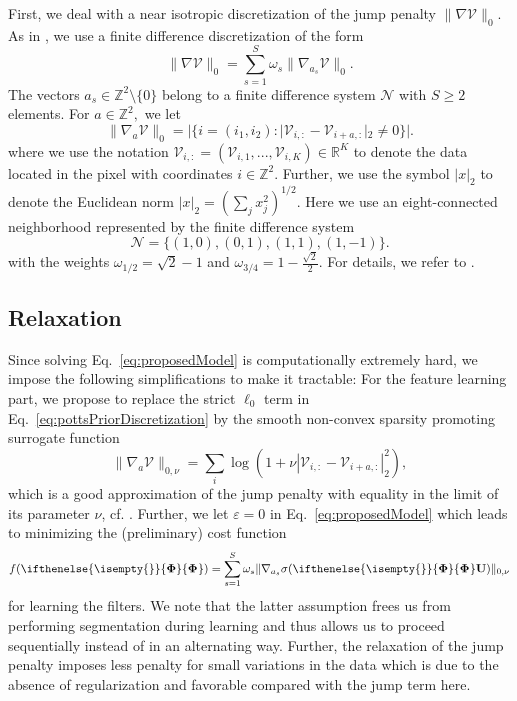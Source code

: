 \documentclass[journal]{IEEEtran}
\newcommand{\Matrix}[1]{\mathbf{#1}}
\newcommand{\Tensor}[1]{\mathcal{#1}}
\newcommand{\AOF}[1]{\ifthenelse{\isempty{#1}}{\boldsymbol{\Phi}}{\boldsymbol{\Phi}_{#1}}}
\newcommand{\SCI}{\Matrix{U}}
\newcommand{\caFRT}{\Tensor{V}}
\begin{document}
First, we deal with a near isotropic discretization of 
the jump penalty $\|\nabla \caFRT  \|_0.$
As in \cite{storath2014fast}, we use 
a finite difference discretization of the form 
\begin{equation}\label{eq:pottsDisc}
	\| \nabla \caFRT \|_0 = \sum_{ s=1}^S  \omega_s \| \nabla_{a_s} \caFRT \|_0.
\end{equation}
The vectors $a_s \in \mathbb{Z}^2 \setminus \{0\}$
 belong to a finite difference system 
$\mathscr{N}$ with $S \geq 2$ elements. 
For $a \in \mathbb{Z}^2,$ we let
\begin{equation}\label{eq:pottsPriorDiscretization}
\| \nabla_{a} \caFRT \|_0 = | \{ i = (i_1, i_2) : |\caFRT_{i, :} - \caFRT_{i + a, :}|_2 \neq 0 \}|.
\end{equation}
where we use the notation $\caFRT_{i, :} = (\caFRT_{i,1}, ..., \caFRT_{i,K}) \in \mathbb{R}^K$
to denote the data located in the pixel with coordinates $i \in \mathbb{Z}^2.$
Further, we use the symbol $|x|_2$ to denote the Euclidean norm $|x|_2 = (\sum_j x_j^2)^{1/2}.$
Here we use an eight-connected neighborhood 
represented by the finite difference system
\begin{equation}\label{eq:N1}
	 \mathscr{N} = \{ (1,0), (0,1), (1,1), (1,-1)\}.
\end{equation}
with the weights 
$
	\omega_{1/2} = \sqrt{2} - 1$ and $\omega_{3/4} =  1 - \frac{\sqrt{2}}{2}.
$
For details, we refer to \cite{chambolle1999finite, storath2014fast}.



\subsection{Relaxation}
\label{subsec:relaxLearning}

Since solving Eq.~\eqref{eq:proposedModel} is computationally extremely hard, 
we impose the following simplifications to make it tractable:
For the feature learning part, 
we propose to replace the strict $\ell_0$ term in Eq.~\eqref{eq:pottsPriorDiscretization} by the smooth non-convex sparsity promoting surrogate function
\begin{equation}\label{eq:l0_log_approx}
    \| \nabla_{a} \Tensor{V} \|_{0,\nu} = \sum_{i} \log (1 + \nu |\caFRT_{i, :} - \caFRT_{i + a, :}|_2^2),
\end{equation}
which is a good approximation of the jump penalty with equality in the limit of its parameter $\nu$, cf.  \cite{kiechle2015}. Further, we let $\varepsilon = 0$ in Eq.~\eqref{eq:proposedModel}
which leads to minimizing the (preliminary) cost function
\begin{equation} \label{eq:sparsity_objective}
f(\AOF{}) = \sum_{ s=1}^S  \omega_s \| \nabla_{a_s} \sigma(\AOF{} \SCI) \|_{0, \nu}
\end{equation}
for learning the filters.
We note that the latter assumption frees us from performing segmentation during learning and thus allows us to proceed sequentially instead of in an alternating way. Further, the relaxation of the jump penalty imposes less penalty for small variations in the data which is due to the absence of regularization and favorable compared with the jump term here.
\end{document}
